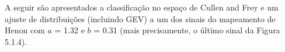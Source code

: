 A seguir são apresentados a classificação no espaço de Cullen and Frey e um ajuste de distribuições (incluindo GEV) a um dos sinais do mapeamento de Henon com $a$ = 1.32 e $b$ = 0.31 (mais precisamente, o último sinal da Figura 5.1.4).

\begin{figure}[ht!]
	\vspace{0mm}	%
	\begin{center}
	\end{center}
	\vspace{-2mm}	%
	\label{ex4_fig1}
\end{figure}

